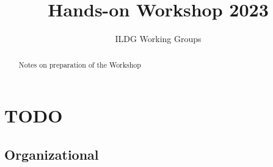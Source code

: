 \documentclass{article}
\title{Hands-on Workshop 2023}
\author{ILDG Working Groups}
\begin{document}
\maketitle

\begin{abstract}
Notes on preparation of the Workshop
\end{abstract}

\section{TODO}
\subsection{Organizational}
\end{document}

